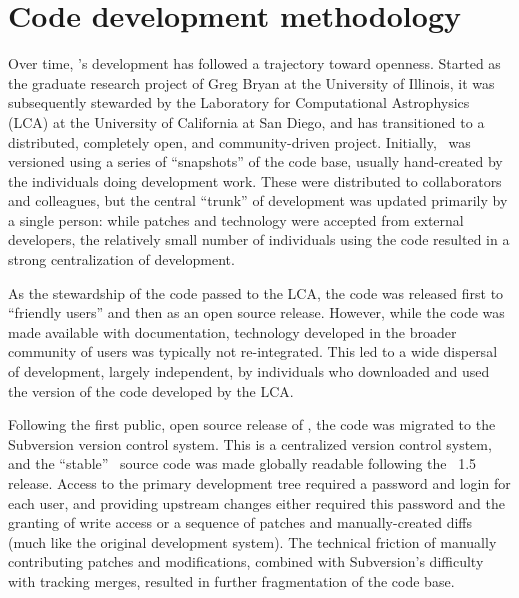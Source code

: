 
\section{Code development methodology}
\label{sec.development}

Over time, \enzo's development has followed a trajectory toward
openness.  Started as the graduate research project of Greg Bryan at
the University of Illinois, it was subsequently stewarded by the
Laboratory for Computational Astrophysics (LCA) at the University of
California at San Diego, and has transitioned to a distributed,
completely open, and community-driven project.  Initially, \enzo\ was
versioned using a series of ``snapshots'' of the code base, usually
hand-created by the individuals doing development work.  These were
distributed to collaborators and colleagues, but the central ``trunk''
of development was updated primarily by a single person: while patches
and technology were accepted from external developers, the relatively
small number of individuals using the code resulted in a strong
centralization of development.

As the stewardship of the code passed to the LCA, the code was
released first to ``friendly users'' and then as an open source
release.  However, while the code was made available with
documentation, technology developed in the broader community of users
was typically not re-integrated.  This led to a wide dispersal of
development, largely independent, by individuals who downloaded and
used the version of the code developed by the LCA.


Following the first public, open source release of \enzo, the code was
migrated to the Subversion version control system.  This is a
centralized version control system, and the ``stable'' \enzo\ source
code was made globally readable following the \enzo\ 1.5 release.
Access to the primary development tree required a password and login
for each user, and providing upstream changes either required this
password and the granting of write access or a sequence of patches and
manually-created diffs (much like the original development system).
The technical friction of manually contributing patches and
modifications, combined with Subversion's difficulty with tracking
merges, resulted in further fragmentation of the code base.

